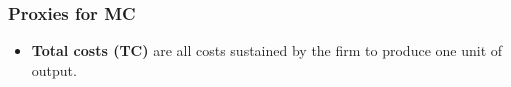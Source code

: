         \subsubsection{Proxies for MC}

            \begin{itemize}
                \item \textbf{Total costs (TC)} are all costs sustained by the firm to produce one unit of output.

\end{itemize}
